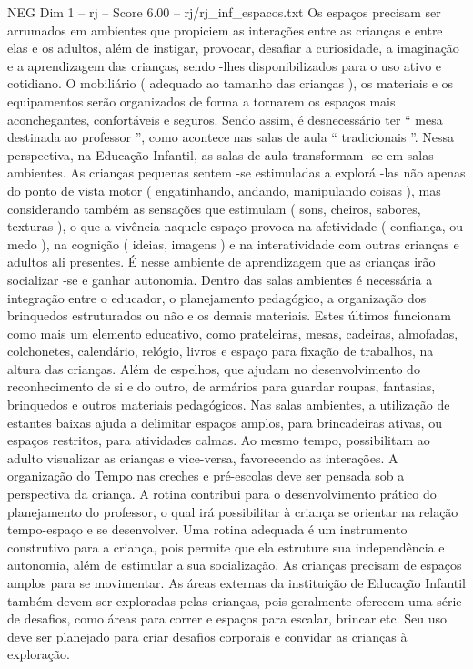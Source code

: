 \begin{textsample}{NEG Dim 1 – rj – Score 6.00 – rj/rj\_inf\_espacos.txt}
Os espaços precisam ser arrumados em ambientes que propiciem as interações entre as crianças e entre elas e os adultos, além de instigar, provocar, desafiar a curiosidade, a imaginação e a aprendizagem das crianças, sendo -lhes disponibilizados para o uso ativo e cotidiano.
O mobiliário ( adequado ao tamanho das crianças ), os materiais e os equipamentos serão organizados de forma a tornarem os espaços mais aconchegantes, confortáveis e seguros.
Sendo assim, é desnecessário ter “ mesa destinada ao professor ”, como acontece nas salas de aula “ tradicionais ”.
Nessa perspectiva, na Educação Infantil, as salas de aula transformam -se em salas ambientes.
As crianças pequenas sentem -se estimuladas a explorá -las não apenas do ponto de vista motor ( engatinhando, andando, manipulando coisas ), mas considerando também as sensações que estimulam ( sons, cheiros, sabores, texturas ), o que a vivência naquele espaço provoca na afetividade ( confiança, ou medo ), na cognição ( ideias, imagens ) e na interatividade com outras crianças e adultos ali presentes.
É nesse ambiente de aprendizagem que as crianças irão socializar -se e ganhar autonomia.
Dentro das salas ambientes é necessária a integração entre o educador, o planejamento pedagógico, a organização dos brinquedos estruturados ou não e os demais materiais.
Estes últimos funcionam como mais um elemento educativo, como prateleiras, mesas, cadeiras, almofadas, colchonetes, calendário, relógio, livros e espaço para fixação de trabalhos, na altura das crianças.
Além de espelhos, que ajudam no desenvolvimento do reconhecimento de si e do outro, de armários para guardar roupas, fantasias, brinquedos e outros materiais pedagógicos.
Nas salas ambientes, a utilização de estantes baixas ajuda a delimitar espaços amplos, para brincadeiras ativas, ou espaços restritos, para atividades calmas.
Ao mesmo tempo, possibilitam ao adulto visualizar as crianças e vice-versa, favorecendo as interações.
A organização do Tempo nas creches e pré-escolas deve ser pensada sob a perspectiva da criança.
A rotina contribui para o desenvolvimento prático do planejamento do professor, o qual irá possibilitar à criança se orientar na relação tempo-espaço e se desenvolver.
Uma rotina adequada é um instrumento construtivo para a criança, pois permite que ela estruture sua independência e autonomia, além de estimular a sua socialização.
As crianças precisam de espaços amplos para se movimentar.
As áreas externas da instituição de Educação Infantil também devem ser exploradas pelas crianças, pois geralmente oferecem uma série de desafios, como áreas para correr e espaços para escalar, brincar etc.
Seu uso deve ser planejado para criar desafios corporais e convidar as crianças à exploração.

\end{textsample}
